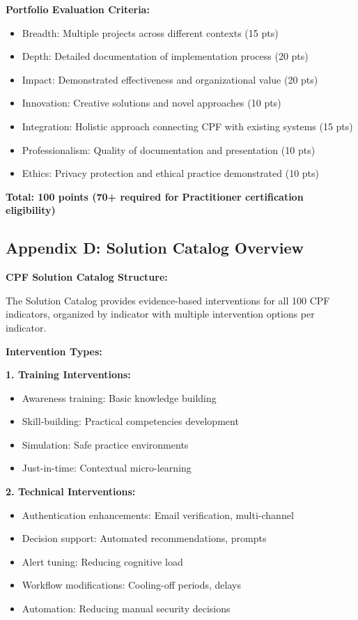 \documentclass[11pt,a4paper]{article}
\begin{document}
\textbf{Portfolio Evaluation Criteria:}
\begin{itemize}
\item Breadth: Multiple projects across different contexts (15 pts)
\item Depth: Detailed documentation of implementation process (20 pts)
\item Impact: Demonstrated effectiveness and organizational value (20 pts)
\item Innovation: Creative solutions and novel approaches (10 pts)
\item Integration: Holistic approach connecting CPF with existing systems (15 pts)
\item Professionalism: Quality of documentation and presentation (10 pts)
\item Ethics: Privacy protection and ethical practice demonstrated (10 pts)
\end{itemize}

\textbf{Total: 100 points (70+ required for Practitioner certification eligibility)}

\subsection{Appendix D: Solution Catalog Overview}

\textbf{CPF Solution Catalog Structure:}

The Solution Catalog provides evidence-based interventions for all 100 CPF indicators, organized by indicator with multiple intervention options per indicator.

\textbf{Intervention Types:}

\textbf{1. Training Interventions:}
\begin{itemize}
\item Awareness training: Basic knowledge building
\item Skill-building: Practical competencies development
\item Simulation: Safe practice environments
\item Just-in-time: Contextual micro-learning
\end{itemize}

\textbf{2. Technical Interventions:}
\begin{itemize}
\item Authentication enhancements: Email verification, multi-channel
\item Decision support: Automated recommendations, prompts
\item Alert tuning: Reducing cognitive load
\item Workflow modifications: Cooling-off periods, delays
\item Automation: Reducing manual security decisions
\end{itemize}
\end{document}
